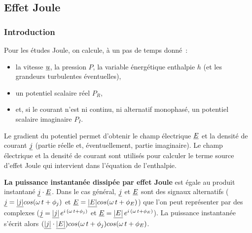 \subsection*{Effet Joule}

\subsubsection*{Introduction}

Pour les études Joule, on calcule,
à un pas de temps donné~:
\begin{itemize}
\item la vitesse $\underline{u}$, la pression $P$, la variable énergétique
enthalpie $h$ (et les grandeurs turbulentes éventuelles),
\item un potentiel scalaire réel $P_R$,
\item et, si le courant n'est ni continu, ni alternatif
monophasé, un potentiel scalaire imaginaire $P_I$.
\end{itemize}

\bigskip
Le gradient du potentiel permet d'obtenir  le champ électrique $\underline{E}$ et
la densité de courant $\underline{j}$ (partie réelle et, éventuellement, partie
imaginaire). Le champ électrique et la
densité de courant sont utilisés pour calculer le
terme source d'effet Joule qui intervient dans l'équation de l'enthalpie.

{\bf La puissance instantanée dissipée par effet Joule} est égale
au produit instantané $\underline{j}\cdot\underline{E}$.
Dans le cas général, $\underline{j}$ et $\underline{E}$ sont des signaux alternatifs
($\underline{j}=\underline{|j|}cos(\omega\,t+\phi_j)$ et
$\underline{E}=\underline{|E|}cos(\omega\,t+\phi_E)$) que l'on peut représenter
par des complexes
($\underline{j}=\underline{|j|}\,e^{i\,(\omega\,t+\phi_j)}$  et
$\underline{E}=\underline{|E|}\,e^{i\,(\omega\,t+\phi_E)}$).
La puissance instantanée s'écrit alors
$(\underline{|j|}\cdot\underline{|E|})cos(\omega\,t+\phi_j)cos(\omega\,t+\phi_E)$.

